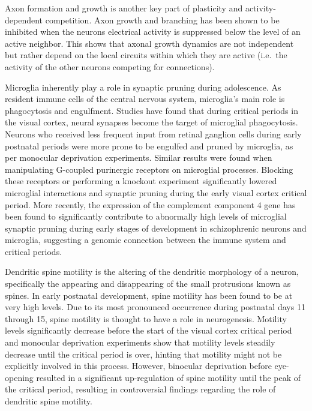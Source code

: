 Axon formation and growth is another key part of plasticity and activity-dependent competition. Axon growth and branching has been shown to be inhibited when the neurons electrical activity is suppressed below the level of an active neighbor. This shows that axonal growth dynamics are not independent but rather depend on the local circuits within which they are active (i.e.~the activity of the other neurons competing for connections).

Microglia inherently play a role in synaptic pruning during adolescence. As resident immune cells of the central nervous system, microglia's main role is phagocytosis and engulfment. Studies have found that during critical periods in the visual cortex, neural synapses become the target of microglial phagocytosis. Neurons who received less frequent input from retinal ganglion cells during early postnatal periods were more prone to be engulfed and pruned by microglia, as per monocular deprivation experiments. Similar results were found when manipulating G-coupled purinergic receptors on microglial processes. Blocking these receptors or performing a knockout experiment significantly lowered microglial interactions and synaptic pruning during the early visual cortex critical period. More recently, the expression of the complement component 4 gene has been found to significantly contribute to abnormally high levels of microglial synaptic pruning during early stages of development in schizophrenic neurons and microglia, suggesting a genomic connection between the immune system and critical periods.

Dendritic spine motility is the altering of the dendritic morphology of a neuron, specifically the appearing and disappearing of the small protrusions known as spines. In early postnatal development, spine motility has been found to be at very high levels. Due to its most pronounced occurrence during postnatal days 11 through 15, spine motility is thought to have a role in neurogenesis. Motility levels significantly decrease before the start of the visual cortex critical period and monocular deprivation experiments show that motility levels steadily decrease until the critical period is over, hinting that motility might not be explicitly involved in this process. However, binocular deprivation before eye-opening resulted in a significant up-regulation of spine motility until the peak of the critical period, resulting in controversial findings regarding the role of dendritic spine motility.

